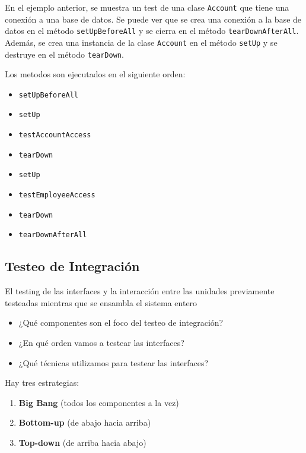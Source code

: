 \begin{paracol}{2}
	
	\colfill
	En el ejemplo anterior, se muestra un test de una clase \texttt{Account} que tiene una conexión a una base de datos. Se puede ver que se crea una conexión a la base de datos en el método \texttt{setUpBeforeAll} y se cierra en el método \texttt{tearDownAfterAll}. Además, se crea una instancia de la clase \texttt{Account} en el método \texttt{setUp} y se destruye en el método \texttt{tearDown}.
	\colfill
	
	\switchcolumn
	Los metodos son ejecutados en el siguiente orden:
	\ns
	\begin{itemize}
		\item \lstinline|setUpBeforeAll|
		\item \lstinline|setUp|
		\item \lstinline|testAccountAccess|
		\item \lstinline|tearDown|
		\item \lstinline|setUp|
		\item \lstinline|testEmployeeAccess|
		\item \lstinline|tearDown|
		\item \lstinline|tearDownAfterAll|
	\end{itemize}
\end{paracol}


\subsection{Testeo de Integración}

\begin{definition}
	El testing de las interfaces y la
	interacción entre las unidades previamente testeadas
	mientras que se ensambla el sistema entero
\end{definition}

\begin{itemize}
	\item ¿Qué componentes son el foco del testeo de integración?
	\item ¿En qué orden vamos a testear las interfaces?
	\item ¿Qué técnicas utilizamos para testear las interfaces?
\end{itemize}

Hay tres estrategias:
\begin{enumerate}
	\item \textbf{Big Bang} (todos los componentes a la vez)
	\item \textbf{Bottom-up} (de abajo hacia arriba)
	\item \textbf{Top-down} (de arriba hacia abajo)
\end{enumerate}

